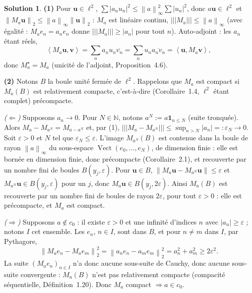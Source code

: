 \documentclass[11pt,a4paper]{article}
\newcommand{\N}{\mathbb{N}}
\newcommand{\Vect}{\operatorname{Vect}}
\newcommand{\norm}[1]{\left\|#1\right\|}
\newcommand{\opnorm}[1]{|\!|\!|#1|\!|\!|}
\newcommand{\ie}{c'est-à-dire}
\newcommand{\ps}[2]{\left\langle #1,#2\right\rangle}
\theoremstyle{definition}
\newtheorem*{solution}{Solution}
\begin{document}
\begin{solution}
\noindent\textbf{(1)} Pour $\mathbf u\in\ell^2$, $\sum|a_nu_n|^2\le\norm a_\infty^2\sum|u_n|^2$, donc $a\mathbf u\in\ell^2$ et $\norm{M_a\mathbf u}_2\le\norm a_\infty\norm{\mathbf u}_2$ : $M_a$ est linéaire continu, $\opnorm{M_a}\le\norm a_\infty$ (avec égalité : $M_ae_n=a_ne_n$ donne $\opnorm{M_a}\ge|a_n|$ pour tout $n$). Auto-adjoint : les $a_n$ étant réels,
\[
\ps{M_a\mathbf u}{\mathbf v}=\sum_na_nu_n\overline{v_n}=\sum_nu_n\overline{a_nv_n}=\ps{\mathbf u}{M_a\mathbf v},
\]
donc $M_a^\star=M_a$ (unicité de l'adjoint, Proposition~4.6).

\medskip
\noindent\textbf{(2)} Notons $B$ la boule unité fermée de $\ell^2$. Rappelons que $M_a$ est compact si $M_a(B)$ est relativement compacte, \ie{} (Corollaire~1.4, $\ell^2$ étant complet) précompacte.

\emph{($\Leftarrow$)} Supposons $a_n\to0$. Pour $N\in\N$, notons $a^N:=a\mathbf 1_{n\le N}$ (suite tronquée). Alors $M_a-M_{a^N}=M_{a-a^N}$ et, par (1), $\opnorm{M_a-M_{a^N}}\le\sup_{n>N}|a_n|=:\varepsilon_N\to0$. Soit $\varepsilon>0$ et $N$ tel que $\varepsilon_N\le\varepsilon$. L'image $M_{a^N}(B)$ est contenue dans la boule de rayon $\norm a_\infty$ du sous-espace $\Vect(e_0,\dots,e_N)$, de dimension finie : elle est bornée en dimension finie, donc précompacte (Corollaire~2.1), et recouverte par un nombre fini de boules $B(y_j,\varepsilon)$. Pour $\mathbf u\in B$, $\norm{M_a\mathbf u-M_{a^N}\mathbf u}\le\varepsilon$ et $M_{a^N}\mathbf u\in B(y_j,\varepsilon)$ pour un $j$, donc $M_a\mathbf u\in B(y_j,2\varepsilon)$. Ainsi $M_a(B)$ est recouverte par un nombre fini de boules de rayon $2\varepsilon$, pour tout $\varepsilon>0$ : elle est précompacte, et $M_a$ est compact.

\emph{($\Rightarrow$)} Supposons $a\notin c_0$ : il existe $\varepsilon>0$ et une infinité d'indices $n$ avec $|a_n|\ge\varepsilon$ ; notons $I$ cet ensemble. Les $e_n$, $n\in I$, sont dans $B$, et pour $n\ne m$ dans $I$, par Pythagore,
\[
\norm{M_ae_n-M_ae_m}_2^2=\norm{a_ne_n-a_me_m}_2^2=a_n^2+a_m^2\ge2\varepsilon^2 .
\]
La suite $(M_ae_n)_{n\in I}$ n'a donc aucune sous-suite de Cauchy, donc aucune sous-suite convergente : $M_a(B)$ n'est pas relativement compacte (compacité séquentielle, Définition~1.20). Donc $M_a$ compact $\Rightarrow a\in c_0$.


\end{solution}
\end{document}

